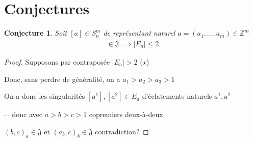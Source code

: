 \documentclass{article}
\newtheorem{conjecture}{Conjecture}
\begin{document}
\newpage

\section{Conjectures}

\begin{conjecture}
    Soit $[a] \in S_n^m$ de représentant naturel $a = (a_1, \dots, a_m) \in \mathbb{Z}^m$
    \begin{align*}
        [a] \in \overline{\mathfrak{J}} \implies |E_a| \leq 2
    \end{align*}
\end{conjecture}

\begin{proof}
    Supposons par contraposée $|E_a| > 2$ ($\star$)

    Donc, sans perdre de généralité, on a $a_1 > a_2 > a_3 > 1$

    On a donc les singularités $[a^1], [a^2] \in E_a$ d'éclatements naturels $a^1, a^2$

    $\cdots$ donc avec $a > b > c > 1$ copremiers deux-à-deux

    ${(b, c)}_a \in \overline{\mathfrak{J}}$ et ${(a_b, c)}_b \in \overline{\mathfrak{J}}$ contradiction?
\end{proof}









\end{document}
